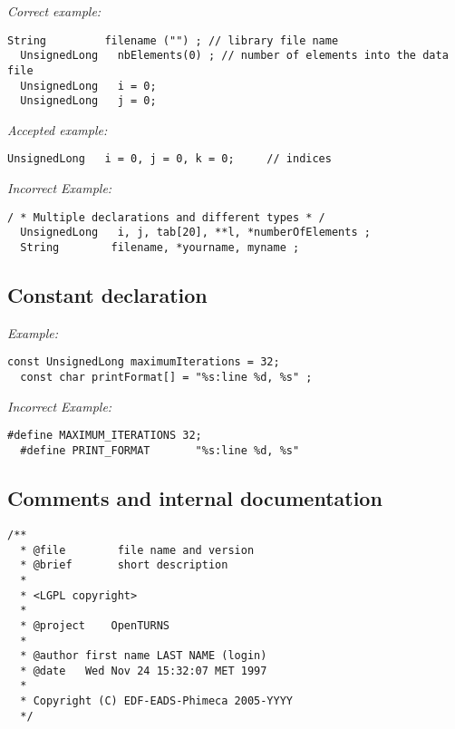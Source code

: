 \emph{Correct example:}
\begin{lstlisting}[frame=TBRL]
  String         filename ("") ; // library file name
  UnsignedLong   nbElements(0) ; // number of elements into the data file
  UnsignedLong   i = 0;
  UnsignedLong   j = 0;
\end{lstlisting}
\emph{Accepted example:}
\begin{lstlisting}[frame=TBRL]
  UnsignedLong   i = 0, j = 0, k = 0;     // indices
\end{lstlisting}
\emph{Incorrect Example:}
\begin{lstlisting}[frame=TBRL]
  / * Multiple declarations and different types * /
  UnsignedLong   i, j, tab[20], **l, *numberOfElements ;
  String        filename, *yourname, myname ;
\end{lstlisting}

\subsection{Constant declaration}
\emph{Example:}
\begin{lstlisting}[frame=TBRL]
  const UnsignedLong maximumIterations = 32;
  const char printFormat[] = "%s:line %d, %s" ;
\end{lstlisting}
\emph{Incorrect Example:}
\begin{lstlisting}[frame=TBRL]
  #define MAXIMUM_ITERATIONS 32;
  #define PRINT_FORMAT       "%s:line %d, %s"
\end{lstlisting}

\subsection{Comments and internal documentation }
\lstset{language=C++, basicstyle=\normalsize}
\begin{lstlisting}[frame=TBRL]
  /**
  * @file        file name and version
  * @brief       short description
  *
  * <LGPL copyright>
  *
  * @project    OpenTURNS
  *
  * @author first name LAST NAME (login)
  * @date   Wed Nov 24 15:32:07 MET 1997
  *
  * Copyright (C) EDF-EADS-Phimeca 2005-YYYY
  */
\end{lstlisting}

